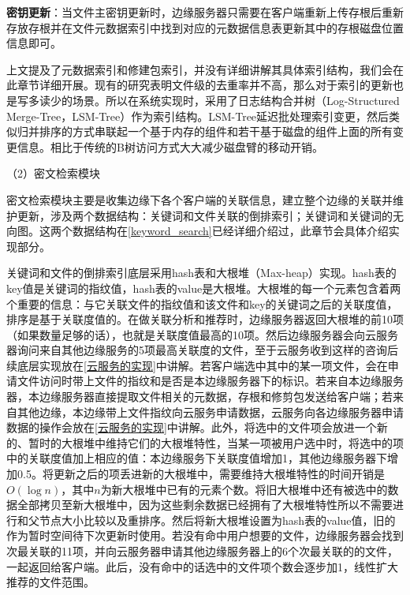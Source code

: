 \documentclass[promaster]{thesis-uestc}
\begin{document}
\textbf{密钥更新}：当文件主密钥更新时，边缘服务器只需要在客户端重新上传存根后重新存放存根并在文件元数据索引中找到对应的元数据信息表更新其中的存根磁盘位置信息即可。

上文提及了元数据索引和修建包索引，并没有详细讲解其具体索引结构，我们会在此章节详细开展。现有的研究表明文件级的去重率并不高，那么对于索引的更新也是写多读少的场景。所以在系统实现时，采用了日志结构合并树（Log-Structured Merge-Tree，LSM-Tree）作为索引结构。LSM-Tree延迟批处理索引变更，然后类似归并排序的方式串联起一个基于内存的组件和若干基于磁盘的组件上面的所有变更信息。相比于传统的B树访问方式大大减少磁盘臂的移动开销。

（2）密文检索模块

密文检索模块主要是收集边缘下各个客户端的关联信息，建立整个边缘的关联并维护更新，涉及两个数据结构：关键词和文件关联的倒排索引；关键词和关键词的无向图。这两个数据结构在\ref{keyword_search}已经详细介绍过，此章节会具体介绍实现部分。

关键词和文件的倒排索引底层采用hash表和大根堆（Max-heap）实现。hash表的key值是关键词的指纹值，hash表的value是大根堆。大根堆的每一个元素包含着两个重要的信息：与它关联文件的指纹值和该文件和key的关键词之后的关联度值，排序是基于关联度值的。在做关联分析和推荐时，边缘服务器返回大根堆的前10项（如果数量足够的话），也就是关联度值最高的10项。然后边缘服务器会向云服务器询问来自其他边缘服务的5项最高关联度的文件，至于云服务收到这样的咨询后续底层实现放在\ref{云服务的实现}中讲解。若客户端选中其中的某一项文件，会在申请文件访问时带上文件的指纹和是否是本边缘服务器下的标识。若来自本边缘服务器，本边缘服务器直接提取文件相关的元数据，存根和修剪包发送给客户端；若来自其他边缘，本边缘带上文件指纹向云服务申请数据，云服务向各边缘服务器申请数据的操作会放在\ref{云服务的实现}中讲解。此外，将选中的文件项会放进一个新的、暂时的大根堆中维持它们的大根堆特性，当某一项被用户选中时，将选中的项中的关联度值加上相应的值：本边缘服务下关联度值增加1，其他边缘服务器下增加0.5。将更新之后的项丢进新的大根堆中，需要维持大根堆特性的时间开销是$O(\log n)$，其中$n$为新大根堆中已有的元素个数。将旧大根堆中还有被选中的数据全部拷贝至新大根堆中，因为这些剩余数据已经拥有了大根堆特性所以不需要进行和父节点大小比较以及重排序。然后将新大根堆设置为hash表的value值，旧的作为暂时空间待下次更新时使用。若没有命中用户想要的文件，边缘服务器会找到次最关联的11项，并向云服务器申请其他边缘服务器上的6个次最关联的的文件，一起返回给客户端。此后，没有命中的话选中的文件项个数会逐步加1，线性扩大推荐的文件范围。
\end{document}

